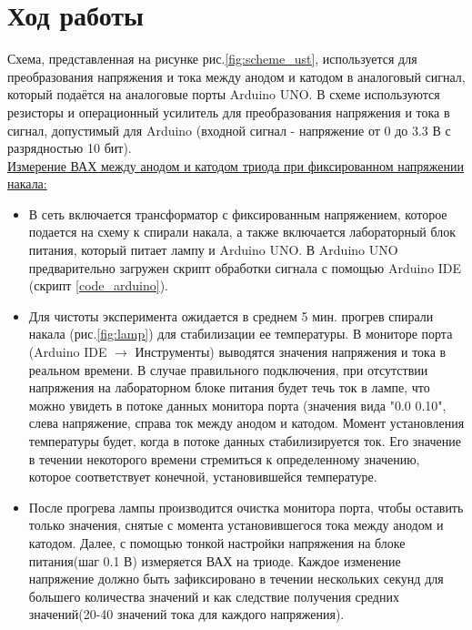 \newpage
\section{Ход работы}

Схема, представленная на рисунке рис.\ref{fig:scheme_ust}, используется для преобразования напряжения и тока между анодом и катодом в аналоговый сигнал, который подаётся на аналоговые порты Arduino UNO. В схеме используются резисторы и операционный усилитель для преобразования напряжения и тока в сигнал, допустимый для Arduino (входной сигнал - напряжение от 0 до 3.3 В с разрядностью 10 бит).\\

\underline{Измерение ВАХ между анодом и катодом триода при фиксированном напряжении накала:}

\begin{itemize}
    \item В сеть включается трансформатор с фиксированным напряжением, которое подается на схему к спирали накала, а также включается лабораторный блок питания, который питает лампу и Arduino UNO. В Arduino UNO предварительно загружен скрипт обработки сигнала с помощью Arduino IDE (скрипт  \ref{code_arduino}).
    \item Для чистоты эксперимента ожидается в среднем 5 мин. прогрев спирали накала (рис.\ref{fig:lamp}) для стабилизации ее температуры. В мониторе порта (Arduino IDE $\rightarrow$ Инструменты) выводятся значения напряжения и тока в реальном времени. В случае правильного подключения, при отсутствии напряжения на лабораторном блоке питания будет течь ток в лампе, что можно увидеть в потоке данных монитора порта (значения вида "0.0 0.10", слева напряжение, справа ток между анодом и катодом. Момент установления температуры будет, когда в потоке данных стабилизируется ток. Его значение в течении некоторого времени стремиться к определенному значению, которое соответствует конечной, установившейся температуре.
    \item После прогрева лампы производится очистка монитора порта, чтобы оставить только значения, снятые с момента установившегося тока между анодом и катодом. Далее, с помощью тонкой настройки напряжения на блоке питания(шаг 0.1 В) измеряется ВАХ на триоде. Каждое изменение напряжение должно быть зафиксировано в течении нескольких секунд для большего количества значений и как следствие получения средних значений(20-40 значений тока для каждого напряжения).
\end{itemize}

